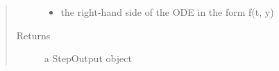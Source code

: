\documentclass[letterpaper,10pt,english]{sphinxmanual}
\begin{document}
\begin{fulllineitems}
\begin{fulllineitems}
\begin{quote}
\begin{description}
\begin{itemize}
\item {} 
 \textendash{} the right-hand side of the ODE in the form f(t, y)

\end{itemize}

\item[{Returns}] \leavevmode
a StepOutput object

\end{description}\end{quote}

\end{fulllineitems}


\end{fulllineitems}

\end{document}
